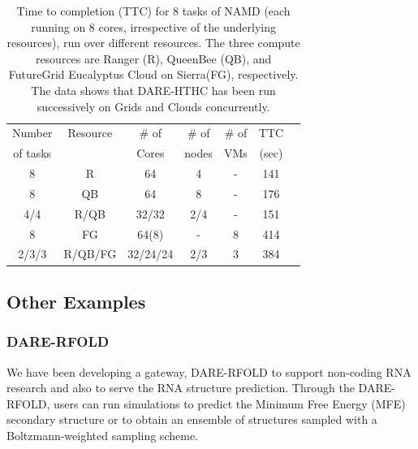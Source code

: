 \documentclass[]{svjour3}
\begin{document}
 \begin{table}
\centering
\small
 \begin{tabular}{|c|c|c|c|c|c|c|} 
 \hline 
 Number           & Resource    & \# of &  \# of     &     \# of     &	TTC  \\
of tasks                &     &  Cores    &nodes&   VMs  & (sec) \\  
\hline
8& R&	64	&4 & - &141\\
\hline                  
8& QB	&	64& 8 &	-&176 \\
\hline
4/4&R/QB	&	32/32 &2/4&-&151\\
\hline
8&FG	&	64(8) & - &8&414 \\
\hline
2/3/3&R/QB/FG	&32/24/24&2/3&	3 &384\\
\hline


\end{tabular}
\caption{Time to completion (TTC) for 8 tasks of NAMD (each running on 8 cores,
  irrespective of the underlying resources), run over different resources. The three
  compute resources are Ranger (R), QueenBee (QB), 
  and  FutureGrid  Eucalyptus Cloud on Sierra(FG), respectively. The
  data shows that DARE-HTHC has been run successively on Grids and
  Clouds concurrently.}
 \label{table:HTHP-Distributed} 
\end{table}

\subsection{Other Examples}
\subsubsection{DARE-RFOLD}
We have been developing a gateway, DARE-RFOLD to support non-coding RNA research
and also to serve the RNA structure prediction. Through the DARE-RFOLD,
users can run simulations to predict the Minimum Free Energy (MFE) secondary
structure or to obtain an ensemble of structures sampled with a Boltzmann-weighted
sampling scheme.

\end{document}
